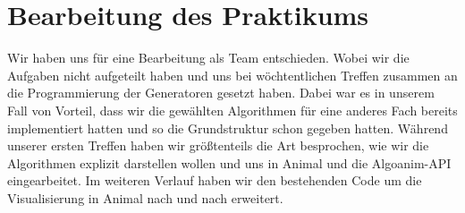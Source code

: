 \documentclass[solution]{report}
\begin{document}
	\chapter{Bearbeitung des Praktikums}
		Wir haben uns für eine Bearbeitung als Team entschieden. Wobei wir die Aufgaben nicht aufgeteilt haben und uns bei wöchtentlichen Treffen zusammen an die Programmierung der Generatoren gesetzt haben. Dabei war es in unserem Fall von Vorteil, dass wir die gewählten Algorithmen für eine anderes Fach bereits implementiert hatten und so die Grundstruktur schon gegeben hatten. Während unserer ersten Treffen haben wir größtenteils die Art besprochen, wie wir die Algorithmen explizit darstellen wollen und uns in Animal und die Algoanim-API eingearbeitet. Im weiteren Verlauf haben wir den bestehenden Code um die Visualisierung in Animal nach und nach erweitert. 
		
\end{document}

